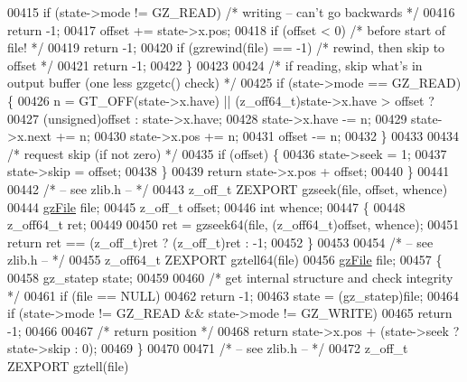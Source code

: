\begin{DoxyCode}
{{{{00415         \textcolor{keywordflow}{if} (state->mode != GZ\_READ)         \textcolor{comment}{/* writing -- can't go backwards */}
00416             \textcolor{keywordflow}{return} -1;
00417         offset += state->x.pos;
00418         \textcolor{keywordflow}{if} (offset < 0)                     \textcolor{comment}{/* before start of file! */}
00419             \textcolor{keywordflow}{return} -1;
00420         \textcolor{keywordflow}{if} (gzrewind(file) == -1)           \textcolor{comment}{/* rewind, then skip to offset */}
00421             \textcolor{keywordflow}{return} -1;
00422     \}
00423 
00424     \textcolor{comment}{/* if reading, skip what's in output buffer (one less gzgetc() check) */}
00425     \textcolor{keywordflow}{if} (state->mode == GZ\_READ) \{
00426         n = GT\_OFF(state->x.have) || (z\_off64\_t)state->x.have > offset ?
00427             (\textcolor{keywordtype}{unsigned})offset : state->x.have;
00428         state->x.have -= n;
00429         state->x.next += n;
00430         state->x.pos += n;
00431         offset -= n;
00432     \}
00433 
00434     \textcolor{comment}{/* request skip (if not zero) */}
00435     \textcolor{keywordflow}{if} (offset) \{
00436         state->seek = 1;
00437         state->skip = offset;
00438     \}
00439     \textcolor{keywordflow}{return} state->x.pos + offset;
00440 \}
00441 
00442 \textcolor{comment}{/* -- see zlib.h -- */}
00443 z\_off\_t ZEXPORT gzseek(file, offset, whence)
00444     \hyperlink{structgz_file__s}{gzFile} file;
00445     z\_off\_t offset;
00446     \textcolor{keywordtype}{int} whence;
00447 \{
00448     z\_off64\_t ret;
00449 
00450     ret = gzseek64(file, (z\_off64\_t)offset, whence);
00451     \textcolor{keywordflow}{return} ret == (z\_off\_t)ret ? (z\_off\_t)ret : -1;
00452 \}
00453 
00454 \textcolor{comment}{/* -- see zlib.h -- */}
00455 z\_off64\_t ZEXPORT gztell64(file)
00456     \hyperlink{structgz_file__s}{gzFile} file;
00457 \{
00458     gz\_statep state;
00459 
00460     \textcolor{comment}{/* get internal structure and check integrity */}
00461     \textcolor{keywordflow}{if} (file == NULL)
00462         \textcolor{keywordflow}{return} -1;
00463     state = (gz\_statep)file;
00464     \textcolor{keywordflow}{if} (state->mode != GZ\_READ && state->mode != GZ\_WRITE)
00465         \textcolor{keywordflow}{return} -1;
00466 
00467     \textcolor{comment}{/* return position */}
00468     \textcolor{keywordflow}{return} state->x.pos + (state->seek ? state->skip : 0);
00469 \}
00470 
00471 \textcolor{comment}{/* -- see zlib.h -- */}
00472 z\_off\_t ZEXPORT gztell(file)
}}}}
\end{DoxyCode}

